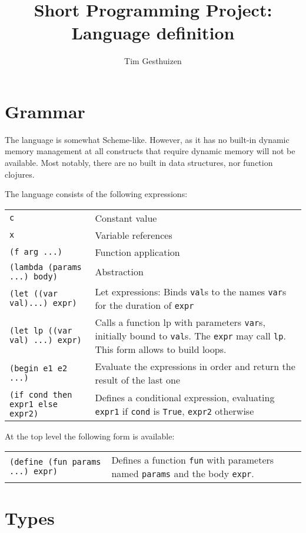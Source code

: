 \documentclass[a4paper, 11pt]{article}
\title{Short Programming Project: Language definition}
\author{Tim Gesthuizen}
\begin{document}
\maketitle

\section{Grammar}

The language is somewhat Scheme-like.
However, as it has no built-in dynamic memory management at all
constructs that require dynamic memory will not be available.
Most notably, there are no built in data structures, nor function
clojures.

The language consists of the following expressions:\\[1.5ex]
\begin{tabularx}{\linewidth}{lX}
  \texttt{c} & Constant value\\
  \texttt{x} & Variable references\\
  \texttt{(f arg ...)} & Function application\\
  \texttt{(lambda (params ...) body)} & Abstraction\\
  \texttt{(let ((var val)...) expr)} & Let expressions:
  Binds \texttt{val}s to the names \texttt{var}s for the duration of
  \texttt{expr}\\
  \texttt{(let lp ((var val) ...) expr)} & Calls a function lp with
  parameters \texttt{var}s, initially bound to \texttt{val}s.
  The \texttt{expr} may call \texttt{lp}.
  This form allows to build loops.\\
  \texttt{(begin e1 e2 ...)} & Evaluate the expressions in order and
  return the result of the last one\\
  \texttt{(if cond then expr1 else expr2)} & Defines a conditional
  expression, evaluating \texttt{expr1} if \texttt{cond} is
  \texttt{True}, \texttt{expr2} otherwise\\
\end{tabularx}

At the top level the following form is available:\\[1.5ex]
\begin{tabularx}{\linewidth}{lX}
  \texttt{(define (fun params ...) expr)} & Defines a function
  \texttt{fun} with parameters named \texttt{params} and the body
  \texttt{expr}.
\end{tabularx}

\section{Types}
\end{document}
